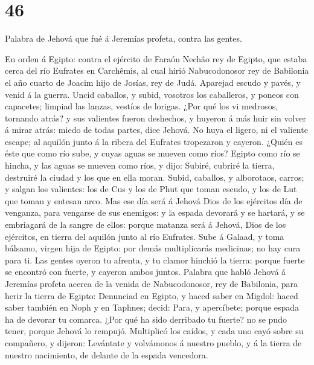 \hypertarget{section-45}{%
\section{46}\label{section-45}}

 Palabra de Jehová que fué á Jeremías profeta, contra las
gentes.

 En orden á Egipto: contra el ejército de Faraón Nechâo rey
de Egipto, que estaba cerca del río Eufrates en Carchêmis, al cual hirió
Nabucodonosor rey de Babilonia el año cuarto de Joacim hijo de Josías,
rey de Judá.  Aparejad escudo y pavés, y venid á la guerra.
 Uncid caballos, y subid, vosotros los caballeros, y poneos
con capacetes; limpiad las lanzas, vestíos de lorigas.  ¿Por
qué los vi medrosos, tornando atrás? y sus valientes fueron deshechos, y
huyeron á más huir sin volver á mirar atrás: miedo de todas partes, dice
Jehová.  No huya el ligero, ni el valiente escape; al
aquilón junto á la ribera del Eufrates tropezaron y cayeron.
 ¿Quién es éste que como río sube, y cuyas aguas se mueven
como ríos?  Egipto como río se hincha, y las aguas se mueven
como ríos, y dijo: Subiré, cubriré la tierra, destruiré la ciudad y los
que en ella moran.  Subid, caballos, y alborotaos, carros; y
salgan los valientes: los de Cus y los de Phut que toman escudo, y los
de Lut que toman y entesan arco.  Mas ese día será á Jehová
Dios de los ejércitos día de venganza, para vengarse de sus enemigos: y
la espada devorará y se hartará, y se embriagará de la sangre de ellos:
porque matanza será á Jehová, Dios de los ejércitos, en tierra del
aquilón junto al río Eufrates.  Sube á Galaad, y toma
bálsamo, virgen hija de Egipto: por demás multiplicarás medicinas; no
hay cura para ti.  Las gentes oyeron tu afrenta, y tu
clamor hinchió la tierra: porque fuerte se encontró con fuerte, y
cayeron ambos juntos.  Palabra que habló Jehová á Jeremías
profeta acerca de la venida de Nabucodonosor, rey de Babilonia, para
herir la tierra de Egipto:  Denunciad en Egipto, y haced
saber en Migdol: haced saber también en Noph y en Taphnes; decid: Para,
y apercíbete; porque espada ha de devorar tu comarca.  ¿Por
qué ha sido derribado tu fuerte? no se pudo tener, porque Jehová lo
rempujó.  Multiplicó los caídos, y cada uno cayó sobre su
compañero, y dijeron: Levántate y volvámonos á nuestro pueblo, y á la
tierra de nuestro nacimiento, de delante de la espada vencedora.
